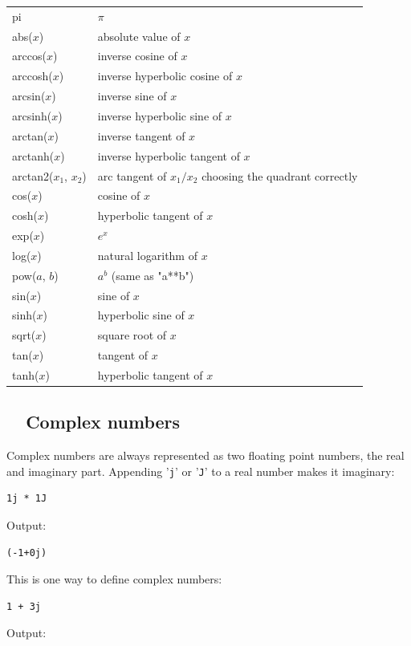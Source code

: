 \begin{center}
\begin{tabular}{|l|l|}
\hline
pi &  $\pi$\\
abs($x$) &  absolute value of $x$\\
arccos($x$) &  inverse cosine of $x$ \\
arccosh($x$) &  inverse hyperbolic cosine of $x$ \\
arcsin($x$) & inverse sine of $x$ \\
arcsinh($x$) & inverse hyperbolic sine of $x$ \\
arctan($x$) & inverse tangent of $x$ \\
arctanh($x$) & inverse hyperbolic tangent of $x$ \\
arctan2($x_1$, $x_2$) & arc tangent of $x_1/x_2$ choosing the quadrant correctly \\
cos($x$) & cosine of $x$ \\
cosh($x$) & hyperbolic tangent of $x$ \\
exp($x$) & $e^x$ \\
log($x$) & natural logarithm of $x$ \\
pow($a$, $b$) & $a^b$ (same as "a**b")\\
sin($x$) & sine of $x$ \\
sinh($x$) & hyperbolic sine of $x$ \\
sqrt($x$) & square root of $x$ \\
tan($x$) & tangent of $x$\\
tanh($x$) & hyperbolic tangent of $x$ \\
\hline
\end{tabular}
\end{center}
\vspace{4mm}
\noindent

\subsection{\ \ Complex numbers}
Complex numbers are always represented as two floating point numbers, the 
real and imaginary part. Appending '{\tt j}' or  '{\tt J}' to a real number
makes it imaginary:

\begin{verbatim}
1j * 1J
\end{verbatim}
Output:

\begin{verbatim}
(-1+0j)
\end{verbatim}
This is one way to define complex numbers:
\begin{verbatim}
1 + 3j
\end{verbatim}
Output:

